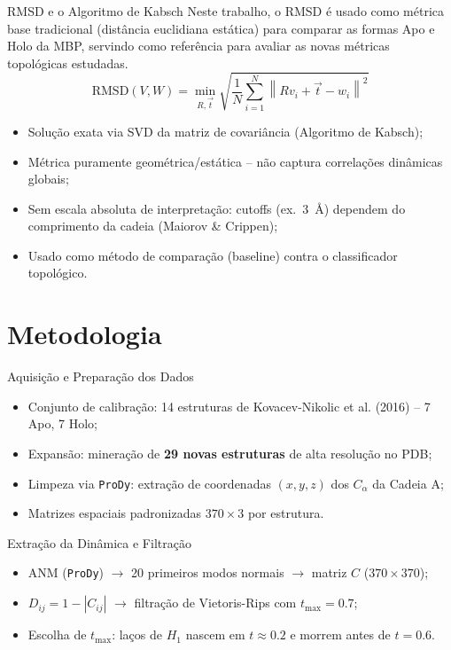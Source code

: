 \documentclass[aspectratio=169]{beamer}
\begin{document}
\begin{frame}{RMSD e o Algoritmo de Kabsch}
  Neste trabalho, o RMSD é usado como métrica base tradicional (distância euclidiana estática) para comparar as formas Apo e Holo da MBP, servindo como referência para avaliar as novas métricas topológicas estudadas.
  \[
    \mathrm{RMSD}(V,W) = \min_{R,\vec t} \sqrt{\frac{1}{N}\sum_{i=1}^N \left\| R v_i + \vec t - w_i \right\|^2}
  \]
  \begin{itemize}
    \item Solução exata via SVD da matriz de covariância (Algoritmo de Kabsch);
    \item Métrica puramente geométrica/estática -- não captura correlações dinâmicas globais;
    \item Sem escala absoluta de interpretação: cutoffs (ex.\ 3~\AA) dependem do comprimento da cadeia (Maiorov \& Crippen);
    \item Usado como método de comparação (baseline) contra o classificador topológico.
  \end{itemize}
\end{frame}

\section{Metodologia}

\begin{frame}{Aquisição e Preparação dos Dados}
  \begin{itemize}
    \item Conjunto de calibração: 14 estruturas de Kovacev-Nikolic et al. (2016) -- 7 Apo, 7 Holo;
    \item Expansão: mineração de \textbf{29 novas estruturas} de alta resolução no PDB;
    \item Limpeza via \texttt{ProDy}: extração de coordenadas $(x,y,z)$ dos $C_\alpha$ da Cadeia A;
    \item Matrizes espaciais padronizadas $370 \times 3$ por estrutura.
  \end{itemize}
\end{frame}

\begin{frame}{Extração da Dinâmica e Filtração}
  \begin{itemize}
    \item ANM (\texttt{ProDy}) $\to$ 20 primeiros modos normais $\to$ matriz $C$ ($370\times370$);
    \item $D_{ij} = 1-|C_{ij}|$ $\to$ filtração de Vietoris-Rips com $t_{\max}=0.7$;
    \item Escolha de $t_{\max}$: laços de $H_1$ nascem em $t\approx 0.2$ e morrem antes de $t=0.6$.
  \end{itemize}
\end{frame}
\end{document}
